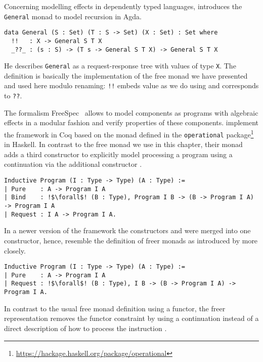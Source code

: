 Concerning modelling effects in dependently typed languages, \citet{mcbride2015turingcompleteness} introduces the \texttt{General} monad to model recursion in Agda.

\begin{verbatim}
data General (S : Set) (T : S -> Set) (X : Set) : Set where
  !!   : X -> General S T X
  _??_ : (s : S) -> (T s -> General S T X) -> General S T X
\end{verbatim}

He describes \texttt{General} as a request\--response tree with values of type \texttt{X}.
The definition is basically the implementation of the free monad we have presented and used here modulo renaming: \texttt{!!} embeds value as we do using  and  corresponds to \texttt{??}.

The formalism FreeSpec~\citep{letan2018modular} allows to model components as programs with algebraic effects in a modular fashion and verify properties of these components.
\citeauthor{letan2018modular} implement the framework in Coq based on the  monad defined in the \texttt{operational} package\footnote{\url{https://hackage.haskell.org/package/operational}} in Haskell.
In contrast to the free monad we use in this chapter, their  monad adds a third constructor to explicitly model processing a program using a continuation via the additional constructor .

\begin{verbatim}
Inductive Program (I : Type -> Type) (A : Type) :=
| Pure    : A -> Program I A
| Bind    : !$\forall$! (B : Type), Program I B -> (B -> Program I A) -> Program I A
| Request : I A -> Program I A.
\end{verbatim}

In a newer version of the framework the constructors  and  were merged into one constructor, hence, resemble the definition of freer monads as introduced by \citet{kiselyov2015freer} more closely.

\begin{verbatim}
Inductive Program (I : Type -> Type) (A : Type) :=
| Pure    : A -> Program I A
| Request : !$\forall$! (B : Type), I B -> (B -> Program I A) -> Program I A.
\end{verbatim}

In contrast to the usual free monad definition using a functor, the freer representation removes the functor constraint by using a continuation  instead of a direct description of how to process the instruction .

